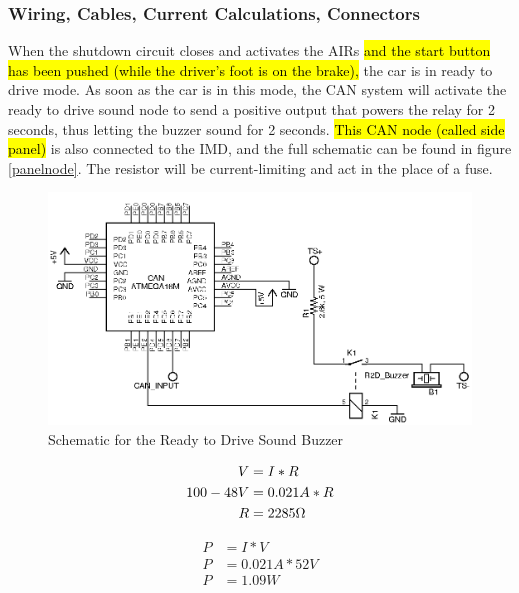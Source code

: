 \documentclass{article}
\DeclareRobustCommand{\hlr}[1]{{\sethlcolor{red}\hl{#1}}}
\begin{document}
        \subsubsection{Wiring, Cables, Current Calculations, Connectors}

            When the shutdown circuit closes and activates the AIRs \hlr{and the start button has been pushed (while the driver's foot is on the brake),} the car is in ready to drive mode. As soon as the car is in this mode, the CAN system will activate the ready to drive sound node to send a positive output that powers the relay for 2 seconds, thus letting the buzzer sound for 2 seconds. \hlr{This CAN node (called side panel)} is also connected to the IMD, and the full schematic can be found in figure \ref{panelnode}. The resistor will be current-limiting and act in the place of a fuse.

                \begin{figure}[H]
                    \centering
                    \includegraphics[width = 0.9 \textwidth]{R2Dsoundbuzzerschem}
                    \caption{Schematic for the Ready to Drive Sound Buzzer}
                    \label{R2D}
                \end{figure}

            \begin{align}
                V &= I * R\\
                100-48 V &= 0.021A * R\\
                R &= 2285 \ohm
            \end{align}

            \begin{align}
                P &= I * V \\
                P &= 0.021A * 52 V \\
                P &= 1.09W
            \end{align}
\end{document}
